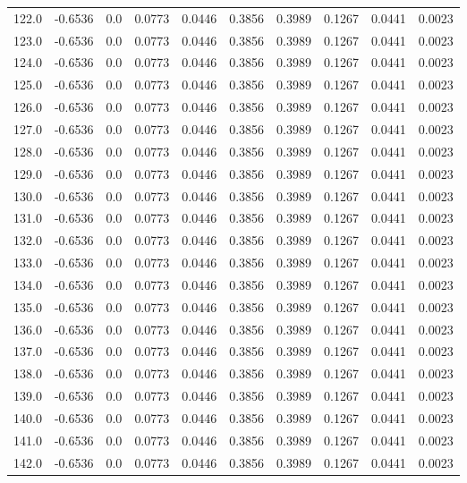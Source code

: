 \begin{longtable}{lrrrrrrrrr}
122.0 & -0.6536 & 0.0 & 0.0773 & 0.0446 & 0.3856 & 0.3989 & 0.1267 & 0.0441 & 0.0023 \\
123.0 & -0.6536 & 0.0 & 0.0773 & 0.0446 & 0.3856 & 0.3989 & 0.1267 & 0.0441 & 0.0023 \\
124.0 & -0.6536 & 0.0 & 0.0773 & 0.0446 & 0.3856 & 0.3989 & 0.1267 & 0.0441 & 0.0023 \\
125.0 & -0.6536 & 0.0 & 0.0773 & 0.0446 & 0.3856 & 0.3989 & 0.1267 & 0.0441 & 0.0023 \\
126.0 & -0.6536 & 0.0 & 0.0773 & 0.0446 & 0.3856 & 0.3989 & 0.1267 & 0.0441 & 0.0023 \\
127.0 & -0.6536 & 0.0 & 0.0773 & 0.0446 & 0.3856 & 0.3989 & 0.1267 & 0.0441 & 0.0023 \\
128.0 & -0.6536 & 0.0 & 0.0773 & 0.0446 & 0.3856 & 0.3989 & 0.1267 & 0.0441 & 0.0023 \\
129.0 & -0.6536 & 0.0 & 0.0773 & 0.0446 & 0.3856 & 0.3989 & 0.1267 & 0.0441 & 0.0023 \\
130.0 & -0.6536 & 0.0 & 0.0773 & 0.0446 & 0.3856 & 0.3989 & 0.1267 & 0.0441 & 0.0023 \\
131.0 & -0.6536 & 0.0 & 0.0773 & 0.0446 & 0.3856 & 0.3989 & 0.1267 & 0.0441 & 0.0023 \\
132.0 & -0.6536 & 0.0 & 0.0773 & 0.0446 & 0.3856 & 0.3989 & 0.1267 & 0.0441 & 0.0023 \\
133.0 & -0.6536 & 0.0 & 0.0773 & 0.0446 & 0.3856 & 0.3989 & 0.1267 & 0.0441 & 0.0023 \\
134.0 & -0.6536 & 0.0 & 0.0773 & 0.0446 & 0.3856 & 0.3989 & 0.1267 & 0.0441 & 0.0023 \\
135.0 & -0.6536 & 0.0 & 0.0773 & 0.0446 & 0.3856 & 0.3989 & 0.1267 & 0.0441 & 0.0023 \\
136.0 & -0.6536 & 0.0 & 0.0773 & 0.0446 & 0.3856 & 0.3989 & 0.1267 & 0.0441 & 0.0023 \\
137.0 & -0.6536 & 0.0 & 0.0773 & 0.0446 & 0.3856 & 0.3989 & 0.1267 & 0.0441 & 0.0023 \\
138.0 & -0.6536 & 0.0 & 0.0773 & 0.0446 & 0.3856 & 0.3989 & 0.1267 & 0.0441 & 0.0023 \\
139.0 & -0.6536 & 0.0 & 0.0773 & 0.0446 & 0.3856 & 0.3989 & 0.1267 & 0.0441 & 0.0023 \\
140.0 & -0.6536 & 0.0 & 0.0773 & 0.0446 & 0.3856 & 0.3989 & 0.1267 & 0.0441 & 0.0023 \\
141.0 & -0.6536 & 0.0 & 0.0773 & 0.0446 & 0.3856 & 0.3989 & 0.1267 & 0.0441 & 0.0023 \\
142.0 & -0.6536 & 0.0 & 0.0773 & 0.0446 & 0.3856 & 0.3989 & 0.1267 & 0.0441 & 0.0023 \\

\end{longtable}
